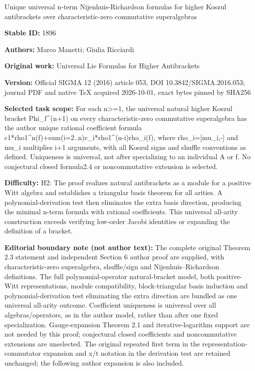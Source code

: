 \documentclass[11pt]{article}
\numberwithin{equation}{section}
\begin{document}
\begin{center}\Large Unique universal n-term Nijenhuis-Richardson formulas for higher Koszul antibrackets over characteristic-zero commutative superalgebras\end{center}
\noindent\textbf{Stable ID:} 1896\par
\noindent\textbf{Authors:} Marco Manetti; Giulia Ricciardi\par
\noindent\textbf{Original work:} Universal Lie Formulas for Higher Antibrackets\par
\noindent\textbf{Version:} Official SIGMA 12 (2016) article 053, DOI 10.3842/SIGMA.2016.053; journal PDF and native TeX acquired 2026-10-01, exact bytes pinned by SHA256\par
\noindent\textbf{Selected task scope:} For each n>=\allowbreak{}1, the universal natural higher Koszul bracket Phi\_f\textasciicircum{}(n+\allowbreak{}1) on every characteristic-zero commutative superalgebra has the author unique rational coefficient formula c1*\allowbreak{}rho1\textasciicircum{}n(f)+\allowbreak{}sum(i=\allowbreak{}2..n)c\_i*\allowbreak{}rho1\textasciicircum{}(n-i)rho\_i(f), where rho\_i=\allowbreak{}[mu\_i,-] and mu\_i multiplies i+\allowbreak{}1 arguments, with all Koszul signs and shuffle conventions as defined. Uniqueness is universal, not after specializing to an individual A or f. No conjectural closed formula2.4 or noncommutative extension is selected.\par
\noindent\textbf{Difficulty:} H2: The proof realizes natural antibrackets as a module for a positive Witt algebra and establishes a triangular basis theorem for all arities. A polynomial-derivation test then eliminates the extra basis direction, producing the minimal n-term formula with rational coefficients. This universal all-arity construction exceeds verifying low-order Jacobi identities or expanding the definition of a bracket.\par
\noindent\textbf{Editorial boundary note (not author text):} The complete original Theorem 2.3 statement and independent Section 6 author proof are supplied, with characteristic-zero superalgebra, shuffle/sign and Nijenhuis–Richardson definitions. The full polynomial-operator natural-bracket model, both positive-Witt representations, module compatibility, block-triangular basis induction and polynomial-derivation test eliminating the extra direction are bundled as one universal all-arity outcome. Coefficient uniqueness is universal over all algebras/operators, as in the author model, rather than after one fixed specialization. Gauge-expansion Theorem 2.1 and iterative-logarithm support are not needed by this proof; conjectural closed coefficients and noncommutative extensions are unselected. The original repeated first term in the representation-commutator expansion and x/t notation in the derivation test are retained unchanged; the following author expansion is also included.\par
\end{document}
